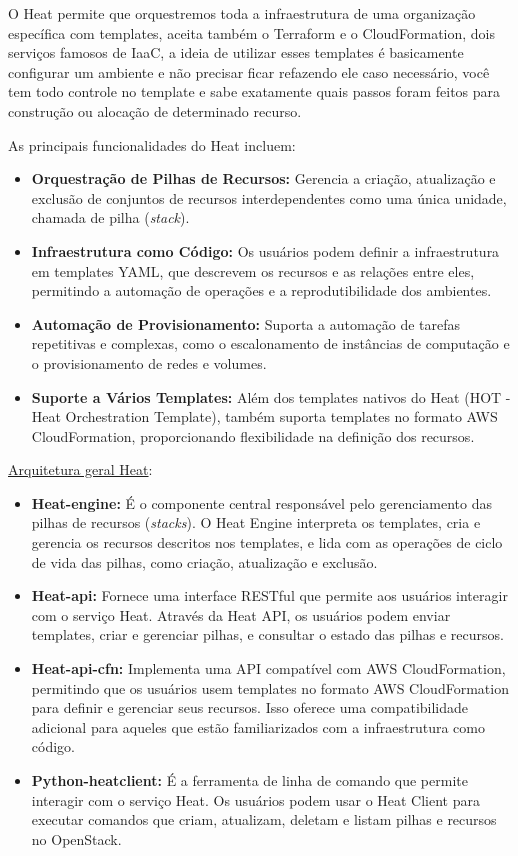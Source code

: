 O Heat permite que orquestremos toda a infraestrutura de uma organização específica com templates, aceita também o Terraform e o CloudFormation, dois serviços famosos de IaaC, a ideia de utilizar esses templates é basicamente configurar um ambiente e não precisar ficar refazendo ele caso necessário, você tem todo controle no template e sabe exatamente quais passos foram feitos para construção ou alocação de determinado recurso.

As principais funcionalidades do Heat incluem:

\begin{itemize}
    \item \textbf{Orquestração de Pilhas de Recursos:} Gerencia a criação, atualização e exclusão de conjuntos de recursos interdependentes como uma única unidade, chamada de pilha (\textit{stack}).
    \item \textbf{Infraestrutura como Código:} Os usuários podem definir a infraestrutura em templates YAML, que descrevem os recursos e as relações entre eles, permitindo a automação de operações e a reprodutibilidade dos ambientes.
    \item \textbf{Automação de Provisionamento:} Suporta a automação de tarefas repetitivas e complexas, como o escalonamento de instâncias de computação e o provisionamento de redes e volumes.
    \item \textbf{Suporte a Vários Templates:} Além dos templates nativos do Heat (HOT - Heat Orchestration Template), também suporta templates no formato AWS CloudFormation, proporcionando flexibilidade na definição dos recursos.
\end{itemize}


\href{https://docs.openstack.org/heat/latest/developing_guides/architecture.html}{Arquitetura geral Heat}:

\begin{itemize}
    \item \textbf{Heat-engine:} É o componente central responsável pelo gerenciamento das pilhas de recursos (\textit{stacks}). O Heat Engine interpreta os templates, cria e gerencia os recursos descritos nos templates, e lida com as operações de ciclo de vida das pilhas, como criação, atualização e exclusão.
    \item \textbf{Heat-api:} Fornece uma interface RESTful que permite aos usuários interagir com o serviço Heat. Através da Heat API, os usuários podem enviar templates, criar e gerenciar pilhas, e consultar o estado das pilhas e recursos.
    \item \textbf{Heat-api-cfn:} Implementa uma API compatível com AWS CloudFormation, permitindo que os usuários usem templates no formato AWS CloudFormation para definir e gerenciar seus recursos. Isso oferece uma compatibilidade adicional para aqueles que estão familiarizados com a infraestrutura como código.
    \item \textbf{Python-heatclient:} É a ferramenta de linha de comando que permite interagir com o serviço Heat. Os usuários podem usar o Heat Client para executar comandos que criam, atualizam, deletam e listam pilhas e recursos no OpenStack.
\end{itemize}


